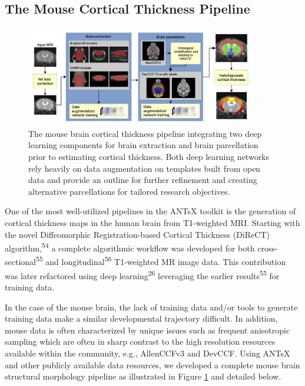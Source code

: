 \documentclass[
  12pt,
]{article}
\begin{document}
\hypertarget{the-mouse-cortical-thickness-pipeline}{%
\subsection{The Mouse Cortical Thickness
Pipeline}\label{the-mouse-cortical-thickness-pipeline}}

\begin{figure}
\centering
\includegraphics[width=0.9\textwidth]{Figures/mousePipeline.png}
\caption{The mouse brain cortical thickness pipeline integrating two 
deep learning components for brain extraction and brain parcellation 
prior to estimating cortical thickness. Both deep learning networks
rely heavily on data augmentation on templates built from open 
data and provide an outline for further refinement and creating 
alternative parcellations for tailored research objectives.}
\label{fig:mouseKK}
\end{figure}

One of the most well-utilized pipelines in the ANTsX toolkit is the
generation of cortical thickness maps in the human brain from
T1-weighted MRI. Starting with the novel Diffeomorphic
Registration-based Cortical Thickness (DiReCT)
algorithm,\textsuperscript{54} a complete algorithmic workflow was
developed for both cross-sectional\textsuperscript{55} and
longitudinal\textsuperscript{56} T1-weighted MR image data. This
contribution was later refactored using deep
learning\textsuperscript{26} leveraging the earlier
results\textsuperscript{55} for training data.

In the case of the mouse brain, the lack of training data and/or tools
to generate training data make a similar developmental trajectory
difficult. In addition, mouse data is often characterized by unique
issues such as frequent anisotropic sampling which are often in sharp
contrast to the high resolution resources available within the
community, e.g., AllenCCFv3 and DevCCF. Using ANTsX and other publicly
available data resources, we developed a complete mouse brain structural
morphology pipeline as illustrated in Figure \ref{fig:mouseKK} and
detailed below.
\end{document}
